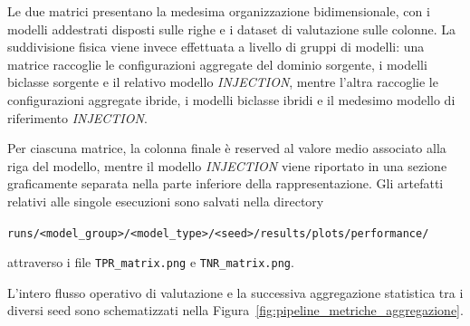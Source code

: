 Le due matrici presentano la medesima organizzazione bidimensionale, con i modelli addestrati disposti sulle righe e i dataset di valutazione sulle colonne. 
La suddivisione fisica viene invece effettuata a livello di gruppi di modelli: una matrice raccoglie le configurazioni aggregate del dominio sorgente, i modelli biclasse sorgente e il relativo modello \textit{INJECTION}, mentre l'altra raccoglie le configurazioni aggregate ibride, i modelli biclasse ibridi e il medesimo modello di riferimento \textit{INJECTION}.

Per ciascuna matrice, la colonna finale è reserved al valore medio associato alla riga del modello, mentre il modello \textit{INJECTION} viene riportato in una sezione graficamente separata nella parte inferiore della rappresentazione. 
Gli artefatti relativi alle singole esecuzioni sono salvati nella directory 
\begin{center}
    \texttt{runs/<model\_group>/<model\_type>/<seed>/results/plots/performance/}
\end{center}
attraverso i file \texttt{TPR\_matrix.png} e \texttt{TNR\_matrix.png}.

L'intero flusso operativo di valutazione e la successiva aggregazione statistica tra i diversi seed sono schematizzati nella Figura~\ref{fig:pipeline_metriche_aggregazione}.


